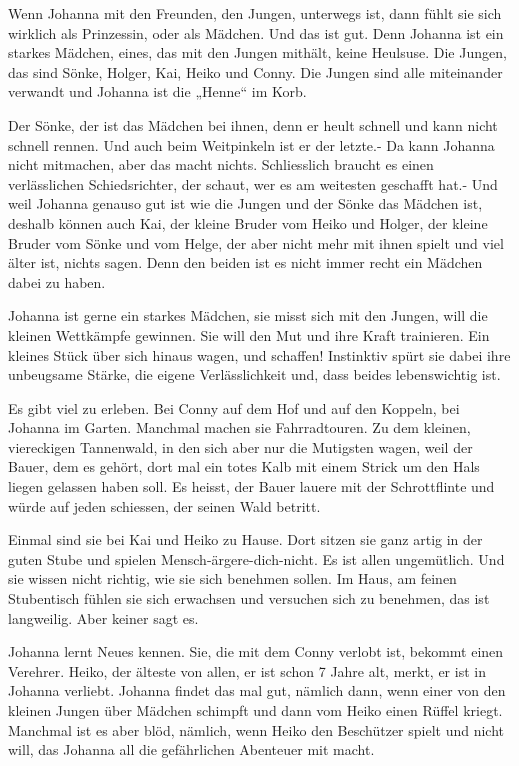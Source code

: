 \documentclass[10pt,titlepage,a5paper]{book}
\begin{document}
Wenn Johanna mit den Freunden, den Jungen, unterwegs ist, dann fühlt sie sich wirklich als Prinzessin, oder als Mädchen. Und das ist gut. Denn Johanna ist ein starkes Mädchen, eines, das mit den Jungen mithält, keine Heulsuse. Die Jungen, das sind Sönke, Holger, Kai, Heiko und Conny.
Die Jungen sind alle miteinander verwandt und Johanna ist die „Henne“ im Korb. 

Der Sönke, der ist das Mädchen bei ihnen, denn er heult schnell und kann nicht schnell rennen. Und auch beim Weitpinkeln ist er der letzte.- Da kann Johanna nicht mitmachen, aber das macht nichts. Schliesslich braucht es einen verlässlichen Schiedsrichter, der schaut, wer es am weitesten geschafft hat.- Und weil Johanna genauso gut ist wie die Jungen und der Sönke das Mädchen ist, deshalb können auch Kai, der kleine Bruder vom Heiko und Holger, der kleine Bruder vom Sönke und vom Helge, der aber nicht mehr mit ihnen spielt und viel älter ist, nichts sagen. Denn den beiden ist es nicht immer recht ein Mädchen dabei zu haben.

Johanna ist gerne ein starkes Mädchen, sie misst sich mit den Jungen, will die kleinen Wettkämpfe gewinnen. Sie will den Mut und ihre Kraft trainieren. Ein kleines Stück über sich hinaus wagen, und schaffen! Instinktiv spürt sie dabei ihre unbeugsame Stärke, die eigene Verlässlichkeit und, dass beides lebenswichtig ist.

Es gibt viel zu erleben. Bei Conny auf dem Hof und auf den Koppeln, bei Johanna im Garten. Manchmal machen sie Fahrradtouren. Zu dem kleinen, viereckigen Tannenwald, in den sich aber nur die Mutigsten wagen, weil der Bauer, dem es gehört, dort mal ein totes Kalb mit einem Strick um den Hals liegen gelassen haben soll. Es heisst, der Bauer lauere mit der Schrottflinte und würde auf jeden schiessen, der seinen Wald betritt.

Einmal sind sie bei Kai und Heiko zu Hause. Dort sitzen sie ganz artig in der guten Stube und spielen Mensch-ärgere-dich-nicht. Es ist allen ungemütlich. Und sie wissen nicht richtig, wie sie sich benehmen sollen. Im Haus, am feinen Stubentisch fühlen sie sich erwachsen und versuchen sich zu benehmen, das ist langweilig. Aber keiner sagt es. 

Johanna lernt Neues kennen. Sie, die mit dem Conny verlobt ist, bekommt einen Verehrer. Heiko, der älteste von allen, er ist schon 7 Jahre alt, merkt, er ist in Johanna verliebt. Johanna findet das mal gut, nämlich dann, wenn einer von den kleinen Jungen über Mädchen schimpft und dann vom Heiko einen Rüffel kriegt. Manchmal ist es aber blöd, nämlich, wenn Heiko den Beschützer spielt und nicht will, das Johanna all die gefährlichen Abenteuer mit ma\-cht.
\end{document}
